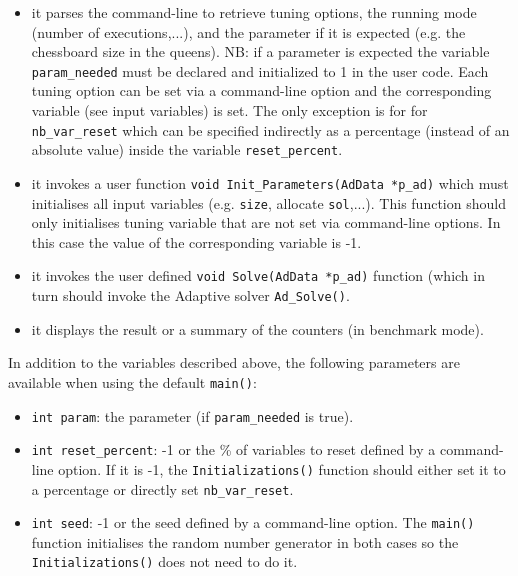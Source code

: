 \documentclass{article}
\begin{document}
\begin{itemize}

\item it parses the command-line to retrieve tuning options, the running mode
  (number of executions,...), and the parameter if it is expected (e.g. the
  chessboard size in the queens). NB: if a parameter is expected the variable
  \texttt{param\_needed} must be declared and initialized to 1 in the user
  code.  Each tuning option can be set via a command-line option and the
  corresponding variable (see input variables) is set. The only exception is
  for for \texttt{nb\_var\_reset} which can be specified indirectly as a
  percentage (instead of an absolute value) inside the variable
  \texttt{reset\_percent}.

\item it invokes a user function \texttt{void Init\_Parameters(AdData *p\_ad)} which
 must initialises all input variables (e.g. \texttt{size},
 allocate \texttt{sol},...). This function should only initialises tuning variable
 that are not set via command-line options. In this case the value of the
 corresponding variable is -1. 

\item it invokes the user defined \texttt{void Solve(AdData *p\_ad)} function
  (which in turn should invoke the Adaptive solver \texttt{Ad\_Solve()}.

\item it displays the result or a summary of the counters (in benchmark mode).

\end{itemize}


In addition to the variables described above, the following parameters
are available when using the default \texttt{main()}:

\begin{itemize}

\item \texttt{int param}: the parameter (if \texttt{param\_needed} is true).

\item \texttt{int reset\_percent}: -1 or the \% of variables to reset defined
 by a command-line option.  If it is -1, the \texttt{Initializations()}
 function should either set it to a percentage or directly set
 \texttt{nb\_var\_reset}.

\item \texttt{int seed}: -1 or the seed defined by a command-line option. The
 \texttt{main()} function initialises the random number generator in both
 cases so the \texttt{Initializations()} does not need to do it.

\end{itemize}
\end{document}
